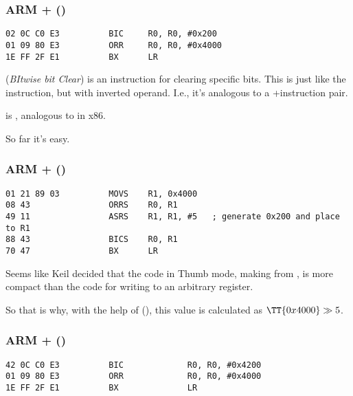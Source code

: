 \subsubsection{ARM + \OptimizingKeilVI (\ARMMode)}

\begin{lstlisting}[caption=\OptimizingKeilVI (\ARMMode),style=customasmARM]
02 0C C0 E3          BIC     R0, R0, #0x200
01 09 80 E3          ORR     R0, R0, #0x4000
1E FF 2F E1          BX      LR
\end{lstlisting}

 (\emph{BItwise bit Clear}) is an instruction for clearing 
specific bits. This is just like the \AND instruction, but with inverted operand.
I.e., it's analogous to a \NOT+\AND instruction pair.

 is , analogous to \OR in x86.

So far it's easy.

\subsubsection{ARM + \OptimizingKeilVI (\ThumbMode)}

\begin{lstlisting}[caption=\OptimizingKeilVI (\ThumbMode),style=customasmARM]
01 21 89 03          MOVS    R1, 0x4000
08 43                ORRS    R0, R1
49 11                ASRS    R1, R1, #5   ; generate 0x200 and place to R1
88 43                BICS    R0, R1
70 47                BX      LR
\end{lstlisting}

Seems like Keil decided that the code in Thumb mode,
making  from , 
is more compact than the code 
for writing  to an arbitrary register.


So that is why, with the help of  (\ASRdesc), this value is calculated as $\TT{0x4000} \gg 5$.

\subsubsection{ARM + \OptimizingXcodeIV (\ARMMode)}
\label{anomaly:LLVM}
\myindex{\CompilerAnomaly}

\begin{lstlisting}[caption=\OptimizingXcodeIV (\ARMMode),label=ARM_leaf_example3,style=customasmARM]
42 0C C0 E3          BIC             R0, R0, #0x4200
01 09 80 E3          ORR             R0, R0, #0x4000
1E FF 2F E1          BX              LR
\end{lstlisting}

